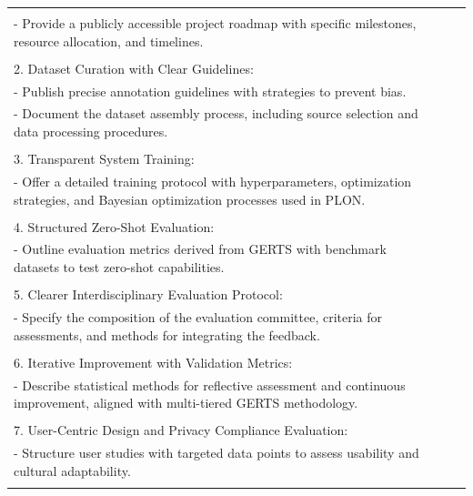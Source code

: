 \documentclass[11pt]{article}
\begin{document}
\begin{center}
\begin{longtable}{p{}p{}p{}}
{    \multicolumn{1}{p{.75\textwidth}}{1. Detailed System Implementation Plan:} \\
    \multicolumn{1}{p{.75\textwidth}}{- Provide a publicly accessible project roadmap with specific milestones, resource allocation, and timelines.} \\ \\
    \multicolumn{1}{p{.75\textwidth}}{2. Dataset Curation with Clear Guidelines:} \\
    \multicolumn{1}{p{.75\textwidth}}{- Publish precise annotation guidelines with strategies to prevent bias.} \\
    \multicolumn{1}{p{.75\textwidth}}{- Document the dataset assembly process, including source selection and data processing procedures.} \\ \\
    \multicolumn{1}{p{.75\textwidth}}{3. Transparent System Training:} \\
    \multicolumn{1}{p{.75\textwidth}}{- Offer a detailed training protocol with hyperparameters, optimization strategies, and Bayesian optimization processes used in PLON.} \\ \\
    \multicolumn{1}{p{.75\textwidth}}{4. Structured Zero-Shot Evaluation:} \\
    \multicolumn{1}{p{.75\textwidth}}{- Outline evaluation metrics derived from GERTS with benchmark datasets to test zero-shot capabilities.} \\ \\
    \multicolumn{1}{p{.75\textwidth}}{5. Clearer Interdisciplinary Evaluation Protocol:} \\
    \multicolumn{1}{p{.75\textwidth}}{- Specify the composition of the evaluation committee, criteria for assessments, and methods for integrating the feedback.} \\ \\
    \multicolumn{1}{p{.75\textwidth}}{6. Iterative Improvement with Validation Metrics:} \\
    \multicolumn{1}{p{.75\textwidth}}{- Describe statistical methods for reflective assessment and continuous improvement, aligned with multi-tiered GERTS methodology.} \\ \\
    \multicolumn{1}{p{.75\textwidth}}{7. User-Centric Design and Privacy Compliance Evaluation:} \\
    \multicolumn{1}{p{.75\textwidth}}{- Structure user studies with targeted data points to assess usability and cultural adaptability.} \\
}
\end{longtable}
\end{center}
\end{document}
